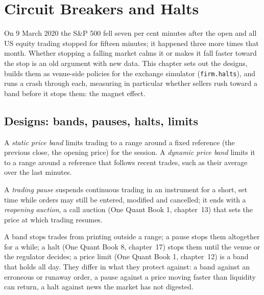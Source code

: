 \chapter{Circuit Breakers and Halts}\label{ch:mx:circuit-breakers-and-halts}

On 9 March 2020 the S\&P 500 fell seven per cent minutes after the open and all US equity trading stopped for fifteen minutes; it happened three
more times that month. Whether stopping a falling market calms it or makes it fall faster toward the stop is an old argument with new data. This chapter
sets out the designs, builds them as venue-side policies for the exchange simulator (\texttt{firm.halts}), and runs a crash through each, measuring in
particular whether sellers rush toward a band before it stops them: the magnet effect.

\section{Designs: bands, pauses, halts, limits}

\begin{definition}\label{def:mx:circuit-breakers-and-halts:bands}
A \emph{static price band} limits trading to a range around a fixed reference (the previous close, the opening price) for the
session. A \emph{dynamic price band} limits it to a range around a reference that follows recent trades, such as their
average over the last minutes.
\end{definition}

\begin{definition}\label{def:mx:circuit-breakers-and-halts:pause}
A \emph{trading pause} suspends continuous trading in an instrument for a short, set time while orders may still be entered,
modified and cancelled; it ends with a \emph{reopening auction}, a call auction (One Quant Book 1, chapter~13) that sets the price at
which trading resumes.
\end{definition}

A band stops trades from printing outside a range; a pause stops them altogether for a while; a halt (One Quant Book 8, chapter~17) stops them until the
venue or the regulator decides; a price limit (One Quant Book 1, chapter~12) is a band that holds all day. They differ in what they protect against: a
band against an erroneous or runaway order, a pause against a price moving faster than liquidity can return, a halt against news the market has not
digested.


